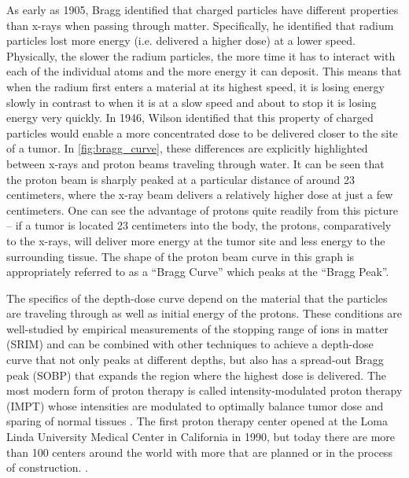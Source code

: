 As early as 1905, Bragg \cite{Bragg_1905_JOS} identified that charged particles have different properties than x-rays when passing through matter. Specifically, he identified that radium particles lost more energy (i.e. delivered a higher dose) at a lower speed. Physically, the slower the radium particles, the more time it has to interact with each of the individual atoms and the more energy it can deposit. This means that when the radium first enters a material at its highest speed, it is losing energy slowly in contrast to when it is at a slow speed and about to stop it is losing energy very quickly. In 1946, Wilson \cite{Wilson_1946_Rad} identified that this property of charged particles would enable a more concentrated dose to be delivered closer to the site of a tumor. In \autoref{fig:bragg_curve}, these differences are explicitly highlighted between x-rays and proton beams traveling through water. It can be seen that the proton beam is sharply peaked at a particular distance of around 23 centimeters, where the x-ray beam delivers a relatively higher dose at just a few centimeters. One can see the advantage of protons quite readily from this picture -- if a tumor is located 23 centimeters into the body, the protons, comparatively to the x-rays, will deliver more energy at the tumor site and less energy to the surrounding tissue. The shape of the proton beam curve in this graph is appropriately referred to as a ``Bragg Curve'' which peaks at the ``Bragg Peak''. 

The specifics of the depth-dose curve depend on the material that the particles are traveling through as well as initial energy of the protons. These conditions are well-studied by empirical measurements of the stopping range of ions in matter (SRIM) \cite{Ziegler_2010_SRIM} and can be combined with other techniques to achieve a depth-dose curve that not only peaks at different depths, but also has a spread-out Bragg peak (SOBP) that expands the region where the highest dose is delivered. The most modern form of proton therapy is called intensity-modulated proton therapy (IMPT) whose intensities are modulated to optimally balance tumor dose and sparing of normal tissues \cite{Mohan_2022_PRO}. The first proton therapy center opened at the Loma Linda University Medical Center in California in 1990, but today there are more than 100 centers around the world with more that are planned or in the process of construction. \cite{Mohan_2022_PRO}. 

